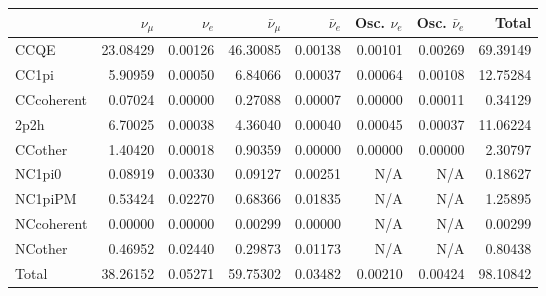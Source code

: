 \begin{tabular} { | l ||r | r | r | r | r | r | | r | }
\hline
              & $\nu_\mu$            & $\nu_e$              & $\bar{\nu}_{\mu}$    & $\bar{\nu}_{e}$      & Osc. $\nu_e$         & Osc. $\bar{\nu}_{e}$ & Total                \\ \hline\hline
 CCQE         & 23.08429             & 0.00126              & 46.30085             & 0.00138              & 0.00101              & 0.00269              & 69.39149             \\ \hline
 CC1pi        & 5.90959              & 0.00050              & 6.84066              & 0.00037              & 0.00064              & 0.00108              & 12.75284             \\ \hline
 CCcoherent   & 0.07024              & 0.00000              & 0.27088              & 0.00007              & 0.00000              & 0.00011              & 0.34129              \\ \hline
 2p2h         & 6.70025              & 0.00038              & 4.36040              & 0.00040              & 0.00045              & 0.00037              & 11.06224             \\ \hline
 CCother      & 1.40420              & 0.00018              & 0.90359              & 0.00000              & 0.00000              & 0.00000              & 2.30797              \\ \hline
 NC1pi0       & 0.08919              & 0.00330              & 0.09127              & 0.00251              & N/A                  & N/A                  & 0.18627              \\ \hline
 NC1piPM      & 0.53424              & 0.02270              & 0.68366              & 0.01835              & N/A                  & N/A                  & 1.25895              \\ \hline
 NCcoherent   & 0.00000              & 0.00000              & 0.00299              & 0.00000              & N/A                  & N/A                  & 0.00299              \\ \hline
 NCother      & 0.46952              & 0.02440              & 0.29873              & 0.01173              & N/A                  & N/A                  & 0.80438              \\ \hline
\hline
 Total        & 38.26152             & 0.05271              & 59.75302             & 0.03482              & 0.00210              & 0.00424              & 98.10842             \\ \hline

\end{tabular}
